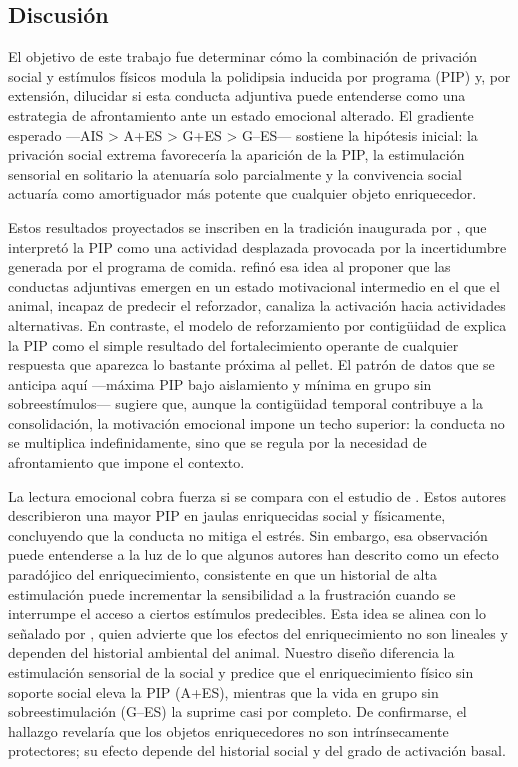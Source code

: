 \documentclass[12pt,a4paper]{article}
\begin{document}
\begin{multicols}{2}
\section{Discusión}

El objetivo de este trabajo fue determinar cómo la combinación de privación social y estímulos físicos modula la polidipsia inducida por programa (PIP) y, por extensión, dilucidar si esta conducta adjuntiva puede entenderse como una estrategia de afrontamiento ante un estado emocional alterado. El gradiente esperado —AIS > A+ES > G+ES > G--ES— sostiene la hipótesis inicial: la privación social extrema favorecería la aparición de la PIP, la estimulación sensorial en solitario la atenuaría solo parcialmente y la convivencia social actuaría como amortiguador más potente que cualquier objeto enriquecedor.

Estos resultados proyectados se inscriben en la tradición inaugurada por \citet{Falk1961}, que interpretó la PIP como una actividad desplazada provocada por la incertidumbre generada por el programa de comida. \citet{Staddon1977} refinó esa idea al proponer que las conductas adjuntivas emergen en un estado motivacional intermedio en el que el animal, incapaz de predecir el reforzador, canaliza la activación hacia actividades alternativas. En contraste, el modelo de reforzamiento por contigüidad de \citet{Killeen2013} explica la PIP como el simple resultado del fortalecimiento operante de cualquier respuesta que aparezca lo bastante próxima al pellet. El patrón de datos que se anticipa aquí —máxima PIP bajo aislamiento y mínima en grupo sin sobreestímulos— sugiere que, aunque la contigüidad temporal contribuye a la consolidación, la motivación emocional impone un techo superior: la conducta no se multiplica indefinidamente, sino que se regula por la necesidad de afrontamiento que impone el contexto.

La lectura emocional cobra fuerza si se compara con el estudio de \citet{FuentesVerdugo2023}. Estos autores describieron una mayor PIP en jaulas enriquecidas social y físicamente, concluyendo que la conducta no mitiga el estrés. Sin embargo, esa observación puede entenderse a la luz de lo que algunos autores han descrito como un efecto paradójico del enriquecimiento, consistente en que un historial de alta estimulación puede incrementar la sensibilidad a la frustración cuando se interrumpe el acceso a ciertos estímulos predecibles. Esta idea se alinea con lo señalado por \citet{Wurbel2001}, quien advierte que los efectos del enriquecimiento no son lineales y dependen del historial ambiental del animal. Nuestro diseño diferencia la estimulación sensorial de la social y predice que el enriquecimiento físico sin soporte social eleva la PIP (A+ES), mientras que la vida en grupo sin sobreestimulación (G--ES) la suprime casi por completo. De confirmarse, el hallazgo revelaría que los objetos enriquecedores no son intrínsecamente protectores; su efecto depende del historial social y del grado de activación basal.


\end{multicols}
\end{document}
